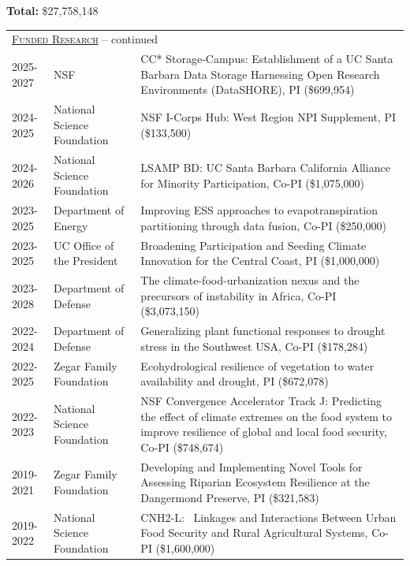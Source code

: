 
{\bf Total: }\$27,758,148  \\

\begin{longtable}{p{1.75cm}>{\raggedright}p{}p{12cm}}

\endfirsthead
\multicolumn{3}{l}{\hspace{.1in} \textsc{\underline{Funded Research}} -- continued
\vspace*{.1in} }  \endhead


2026-2028 & State of California & Space Vandenberg, PI (\$1,109,156) \\ 
2025-2027 & NSF & CC* Storage-Campus: Establishment of a UC Santa Barbara Data Storage Harnessing Open Research Environments (DataSHORE), PI (\$699,954) \\ 
2024-2025 & National Science Foundation & NSF I-Corps Hub: West Region NPI Supplement, PI (\$133,500) \\ 
2024-2026 & National Science Foundation & LSAMP BD: UC Santa Barbara California Alliance for Minority Participation, Co-PI (\$1,075,000) \\ 
2023-2025 & Department of Energy & Improving ESS approaches to evapotranspiration partitioning through data fusion, Co-PI (\$250,000) \\ 
2023-2025 & UC Office of the President & Broadening Participation and Seeding Climate Innovation for the Central Coast, PI (\$1,000,000) \\ 
2023-2028 & Department of Defense & The climate-food-urbanization nexus and the precursors of instability in Africa, Co-PI (\$3,073,150) \\ 
2022-2024 & Department of Defense & Generalizing plant functional responses to drought stress in the Southwest USA, Co-PI (\$178,284) \\ 
2022-2025 & Zegar Family Foundation & Ecohydrological resilience of vegetation to water availability and drought, PI (\$672,078) \\ 
2022-2023 & National Science Foundation & NSF Convergence Accelerator Track J: Predicting the effect of climate extremes on the food system to improve resilience of global and local food security, Co-PI (\$748,674) \\ 
2019-2021 & Zegar Family Foundation & Developing and Implementing Novel Tools for Assessing Riparian Ecosystem Resilience at the Dangermond Preserve, PI (\$321,583) \\ 
2019-2022 & National Science Foundation & CNH2-L:  Linkages and Interactions Between Urban Food Security and Rural Agricultural Systems, Co-PI (\$1,600,000) \\ 

\end{longtable}
